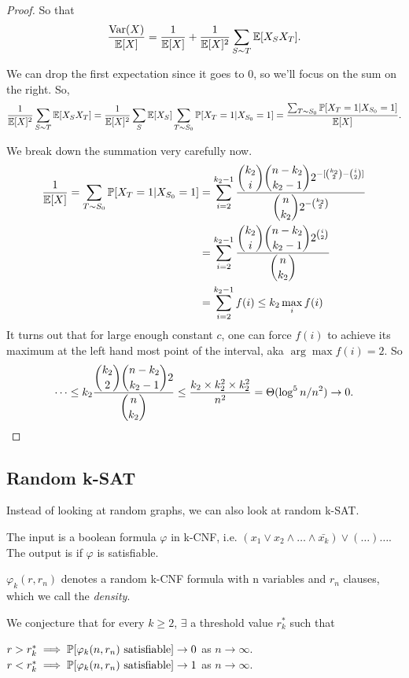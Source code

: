 \documentclass[11 pt]{scrartcl}
\begin{document}
\begin{proof}
    So that
    \[ \dfrac{\text{Var}(X)}{\mathbb E[X]} = \dfrac{1}{\mathbb E[X]} + \dfrac{1}{\mathbb E[X]^2} \sum_{S\sim T} \mathbb E[X_S X_T].\] 

    We can drop the first expectation since it goes to $0$, so we'll focus on the sum on the right. So, 
    \[ \dfrac{1}{\mathbb E[X]^2} \sum_{S\sim T} \mathbb E[X_S X_T] = \dfrac{1}{\mathbb E[X]^2} \sum_S \mathbb E[X_S] \sum_{T \sim S_0} \mathbb P[X_T = 1 | X_{S_0} = 1] = \dfrac{ \sum_{T \sim S_0} \mathbb P[X_T = 1 | X_{S_0} = 1]}{\mathbb E[X]}.\] 

    We break down the summation very carefully now.  
    \begin{align*}
        \dfrac{1}{\mathbb E[X]} = \sum_{T \sim S_0} \mathbb P[X_T = 1 | X_{S_0} = 1] &= \sum_{i = 2}^{k_2-1} \dfrac{\dbinom{k_2}{i} \dbinom{n-k_2}{k_2-1} 2^{-[\binom{k_2}{2}-\binom{i}{2}]}}{\dbinom{n}{k_2}2^{-\binom{k_2}{2}}} \\ 
                                                     &= \sum_{i = 2}^{k_2-1} \dfrac{\dbinom{k_2}{i} \dbinom{n-k_2}{k_2-1} 2^{\binom{i}{2}}}{\dbinom{n}{k_2}} \\ 
                                                     &= \sum_{i=2}^{k_2-1} f(i) \leq  k_2 \max_i f(i)
    \end{align*}
    It turns out that for large enough constant $c$, one can force $f(i)$ to achieve its maximum at the left hand most point of the interval, aka $\arg\max f(i) = 2$. So 
\[ \dots \leq k_2  \dfrac{\dbinom{k_2}{2}\dbinom{n-k_2}{k_2-1}2}{\dbinom{n}{k_2}} \leq \dfrac{k_2 \times k_2^2 \times k_2^2}{n^2} = \Theta(\log^5 n/n^2) \to 0.\] 
\end{proof}

\subsection{Random k-SAT}

Instead of looking at random graphs, we can also look at random k-SAT. 

The input is a boolean formula $\varphi$ in k-CNF, i.e. $(x_1 \lor x_2\land \dots \land \bar{x_k}) \lor (\dots) \dots$. The output is if $\varphi$ is satisfiable. 

\begin{definition}
    $\varphi_k(r, r_n)$ denotes a random k-CNF formula with n variables and $r_n$ clauses, which we call the \emph{density}.  
\end{definition}

We conjecture that for every $k \geq 2$, $\exists$ a threshold value $r_k^*$ such that 
\begin{enumerate}[(i)]
    \ii $r > r_k^* \implies \mathbb P[\varphi_k(n, r_n)\text{ satisfiable}] \to 0$ as $n\to \infty$. 
    \ii $r < r_k^* \implies \mathbb P[\varphi_k(n, r_n)\text{ satisfiable}] \to 1$ as $n\to \infty$. 
\end{enumerate}
\end{document}
